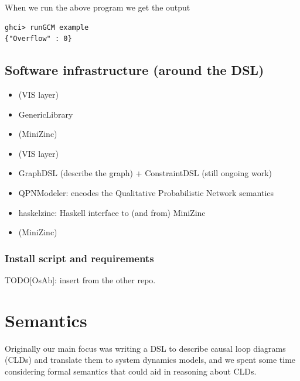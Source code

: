 \documentclass[]{article}
\begin{document}
When we run the above program we get the output

\begin{verbatim}
ghci> runGCM example
{"Overflow" : 0}
\end{verbatim}


\subsection{Software infrastructure (around the
DSL)}\label{software-infrastructure-around-the-dsl}



\begin{itemize}
\item
  (VIS layer)
\item
  GenericLibrary
\item
  (MiniZinc)
\item
  (VIS layer)
\item
  GraphDSL (describe the graph) + ConstraintDSL (still ongoing work)
\item
  QPNModeler: encodes the Qualitative Probabilistic Network semantics
\item
  haskelzinc: Haskell interface to (and from) MiniZinc
\item
  (MiniZinc)
\end{itemize}

\subsubsection{Install script and
requirements}\label{install-script-and-requirements}

TODO{[}OsAb{]}: insert from the other repo.

\section{Semantics}\label{semantics}
Originally our main focus was writing a DSL to describe causal loop diagrams (CLDs) and
translate them to system dynamics models, and we spent some time considering
formal semantics that could aid in reasoning about CLDs.
\end{document}
